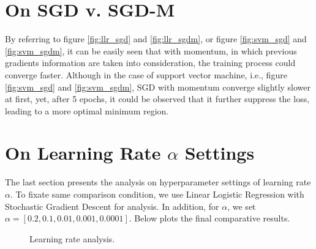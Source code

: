 \documentclass[a4paper,12pt]{article}
\begin{document}
\section*{On SGD v. SGD-M}
\vspace*{-0.4cm}
By referring to figure \ref{fig:llr_sgd} and \ref{fig:llr_sgdm}, 
or figure \ref{fig:svm_sgd} and \ref{fig:svm_sgdm}, it can be easily seen that 
with momentum, in which previous gradients information are taken into consideration,
the training process could converge faster.
Although in the case of support vector machine, 
i.e., figure \ref{fig:svm_sgd} and \ref{fig:svm_sgdm},
SGD with momentum converge slightly slower at first,
yet, after 5 epochs, it could be observed that it further suppress the loss,
leading to a more optimal minimum region.
\section*{On Learning Rate $\alpha$ Settings}
\vspace*{-0.4cm}
The last section presents the analysis on hyperparameter settings of learning rate $\alpha$.
To fixate same comparison condition, we use Linear Logistic Regression
with Stochastic Gradient Descent for analysis.
In addition, for $\alpha$, we set $\alpha=[0.2,0.1,0.01,0.001,0.0001]$.
Below plots the final comparative results.
\begin{figure}[!htb]
   \captionsetup[subfigure]{justification=centering}
   \centering
   \hspace{1cm}%
   \caption{Learning rate analysis.}
\end{figure}
\end{document}
